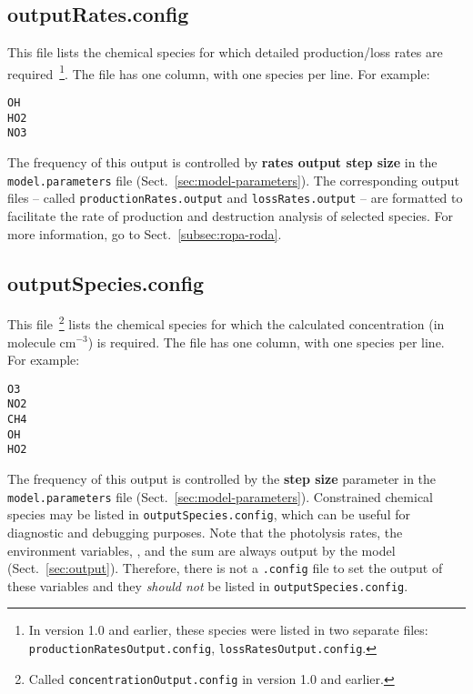 \subsection{outputRates.config} \label{subsec:outputrates}

This file lists the chemical species for which detailed
production/loss rates are required~\footnote{In version 1.0 and
  earlier, these species were listed in two separate files:
  \texttt{productionRatesOutput.config}, \texttt{lossRatesOutput.config}.}.
The file has one column, with one species per line. For example:

\begin{verbatim}
OH
HO2
NO3
\end{verbatim}

The frequency of this output is controlled by \textbf{rates output step size}
in the \texttt{model.parameters} file (Sect.~\ref{sec:model-parameters}).
The corresponding output files -- called \texttt{productionRates.output}
and \texttt{lossRates.output} -- are formatted to facilitate the rate
of production and destruction analysis of selected species. For more
information, go to Sect.~\ref{subsec:ropa-roda}.

\subsection{outputSpecies.config} \label{subsec:outputspecies}

This file~\footnote{Called \texttt{concentrationOutput.config} in
  version 1.0 and earlier.} lists the chemical species for which the
calculated concentration (in molecule cm$^{-3}$) is required. The file
has one column, with one species per line. For example:

\begin{verbatim}
O3
NO2
CH4
OH
HO2
\end{verbatim}

The frequency of this output is controlled by the \textbf{step size} parameter
in the \texttt{model.parameters} file (Sect.~\ref{sec:model-parameters}).
Constrained chemical species may be listed in \texttt{outputSpecies.config},
which can be useful for diagnostic and debugging purposes. Note that
the photolysis rates, the environment variables, , and the
 sum are always output by the model (Sect.~\ref{sec:output}).
Therefore, there is not a \texttt{.config} file to set the output of
these variables and they \emph{should not} be listed in
\texttt{outputSpecies.config}.

